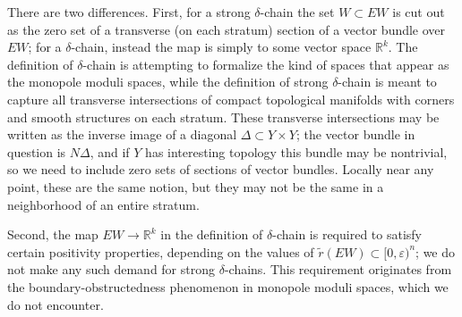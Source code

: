 \documentclass[10pt,a4paper]{amsart}
\theoremstyle{definition}
\theoremstyle{remark}
\numberwithin{figure}{qchap}
\begin{document}
There are two differences. First, for a strong $\delta$-chain the set $W \subset EW$ is cut out as the zero set of a transverse (on each stratum) section of a vector bundle over $EW$; for a $\delta$-chain, instead the map is simply to some vector space $\mathbb R^k$. The definition of $\delta$-chain is attempting to formalize the kind of spaces that appear as the monopole moduli spaces, while the definition of strong $\delta$-chain is meant to capture all transverse intersections of compact topological manifolds with corners and smooth structures on each stratum. These transverse intersections may be written as the inverse image of a diagonal $\Delta \subset Y \times Y$; the vector bundle in question is $N\Delta$, and if $Y$ has interesting topology this bundle may be nontrivial, so we need to include zero sets of sections of vector bundles. Locally near any point, these are the same notion, but they may not be the same in a neighborhood of an entire stratum.

Second, the map $EW \to \mathbb R^k$ in the definition of $\delta$-chain is required to satisfy certain positivity properties, depending on the values of $\tilde r(EW) \subset [0,\varepsilon)^n$; we do not make any such demand for strong $\delta$-chains. This requirement originates from the boundary-obstructedness phenomenon in monopole moduli spaces, which we do not encounter.
\end{document}
